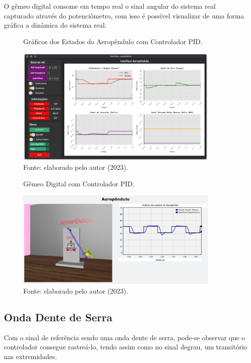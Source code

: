 O gêmeo digital consome em tempo real o sinal angular do sistema real capturado através do potenciômetro, com isso é possível visualizar de uma forma gráfica a dinâmica do sistema real.

\begin{figure}[!h]
	\centering
	\caption{Gráficos dos Estados do Aeropêndulo com Controlador PID.}
	\includegraphics[width=0.9\textwidth]{Capitulos/3_1_resultados_discurcao/3_figuras/mf_gui_d1.png}
	\caption*{Fonte: elaborado pelo autor (2023).}
	\label{fig3:image_24}
\end{figure}


\begin{figure}[!h]
	\centering
	\caption{Gêmeo Digital com Controlador PID.}
	\includegraphics[width=0.9\textwidth]{Capitulos/3_1_resultados_discurcao/3_figuras/mf_gemeo_d1.png}
	\caption*{Fonte: elaborado pelo autor (2023).}
	\label{fig3:image_25}
\end{figure}


\subsection{Onda Dente de Serra}

Com o sinal de referência sendo uma onda dente de serra, pode-se observar que o controlador consegue rastreá-lo, tendo assim como no sinal degrau, um transitório nas extremidades.

